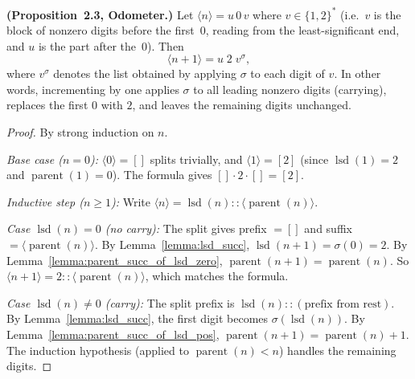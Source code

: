 \begin{lemma}\label{lemma:odometer}\leanok
\textbf{(Proposition~2.3, Odometer.)}
Let $\langle n \rangle = u\, 0\, v$ where $v \in \{1,2\}^*$
(i.e.\ $v$ is the block of nonzero digits before the first~$0$, reading
from the least-significant end, and $u$ is the part after the~$0$).
Then
\[
  \langle n + 1 \rangle = u\; 2\; v^\sigma,
\]
where $v^\sigma$ denotes the list obtained by applying $\sigma$ to each
digit of $v$.  In other words, incrementing by one applies $\sigma$ to
all leading nonzero digits (carrying), replaces the first $0$ with $2$,
and leaves the remaining digits unchanged.
\end{lemma}
\begin{proof}\leanok
By strong induction on $n$.

\emph{Base case ($n = 0$):}
$\langle 0 \rangle = []$ splits trivially, and $\langle 1 \rangle = [2]$
(since $\operatorname{lsd}(1) = 2$ and $\operatorname{parent}(1) = 0$).
The formula gives $[] \cdot 2 \cdot [] = [2]$.

\emph{Inductive step ($n \ge 1$):}
Write $\langle n \rangle = \operatorname{lsd}(n) :: \langle \operatorname{parent}(n) \rangle$.

\emph{Case $\operatorname{lsd}(n) = 0$ (no carry):}
The split gives prefix $= []$ and suffix $= \langle \operatorname{parent}(n) \rangle$.
By Lemma~\ref{lemma:lsd_succ}, $\operatorname{lsd}(n+1) = \sigma(0) = 2$.
By Lemma~\ref{lemma:parent_succ_of_lsd_zero}, $\operatorname{parent}(n+1) = \operatorname{parent}(n)$.
So $\langle n+1 \rangle = 2 :: \langle \operatorname{parent}(n) \rangle$,
which matches the formula.

\emph{Case $\operatorname{lsd}(n) \ne 0$ (carry):}
The split prefix is $\operatorname{lsd}(n) :: (\text{prefix from rest})$.
By Lemma~\ref{lemma:lsd_succ}, the first digit becomes $\sigma(\operatorname{lsd}(n))$.
By Lemma~\ref{lemma:parent_succ_of_lsd_pos}, $\operatorname{parent}(n+1) = \operatorname{parent}(n) + 1$.
The induction hypothesis (applied to $\operatorname{parent}(n) < n$) handles
the remaining digits.
\end{proof}


